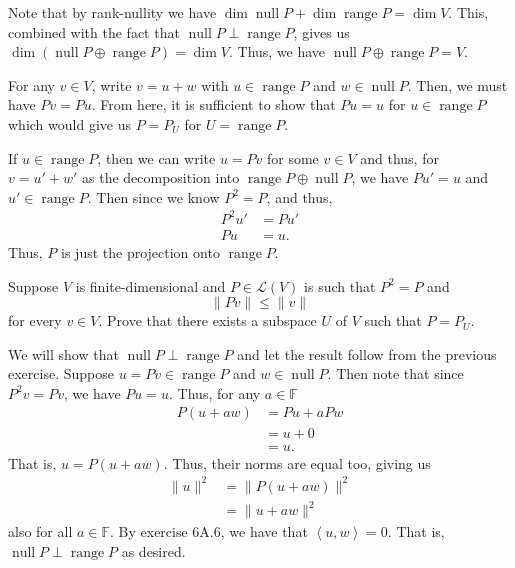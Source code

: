 \documentclass[12 pt, letterpaper]{hmcpset}
\begin{document}
\begin{solution}
	Note that by rank-nullity we have $\dim \operatorname{null} P + \dim \operatorname{range} P = \dim V$. This, combined with the fact that $\operatorname{null} P \perp \operatorname{range} P$, gives us $\dim (\operatorname{null} P \oplus \operatorname{range} P) = \dim V$. Thus, we have $\operatorname{null} P \oplus \operatorname{range} P = V$.

	For any $v \in V$, write $v = u + w$ with $u \in \operatorname{range} P$ and $w \in \operatorname{null} P$. Then, we must have $Pv = Pu$. From here, it is sufficient to show that $Pu = u$ for $u \in \operatorname{range} P$ which would give us $P = P_{U}$ for $U = \operatorname{range} P$.

	If $u \in \operatorname{range} P$, then we can write $u = Pv$ for some $v \in V$ and thus, for $v = u' + w'$ as the decomposition into $\operatorname{range} P \oplus \operatorname{null} P$, we have $Pu' = u$ and $u' \in \operatorname{range} P$. Then since we know $P^{2} = P$, and thus,
	\[
		\begin{split}
			P^{2} u' & = P u' \\
			P u & = u.
		\end{split}
	\]
	Thus, $P$ is just the projection onto $\operatorname{range} P$.
\end{solution}

\pagebreak

\begin{problem}[8]
	Suppose $V$ is finite-dimensional and $P \in \mathcal{L}(V)$ is such that $P^{2} = P$ and
	\[
		\lVert Pv \rVert \le \lVert v \rVert
	\]
	for every $v \in V$. Prove that there exists a subspace $U$ of $V$ such that $P = P_{U}$.
\end{problem}

\begin{solution}
	We will show that $\operatorname{null} P \perp \operatorname{range} P$ and let the result follow from the previous exercise. Suppose $u = Pv \in \operatorname{range} P$ and $w \in \operatorname{null} P$. Then note that since $P^{2} v = Pv$, we have $Pu = u$. Thus, for any $a \in \mathbb{F}$
	\[
		\begin{split}
			P(u + a w) & = Pu + a Pw \\
				   & = u + 0 \\
				   & = u.
		\end{split}
	\]
	That is, $u = P(u + aw)$. Thus, their norms are equal too, giving us
	\[
		\begin{split}
			\lVert u \rVert^{2} & = \lVert P(u + aw) \rVert^{2} \\
					    & = \lVert u + aw \rVert^{2}
		\end{split}
	\]
	also for all $a \in \mathbb{F}$. By exercise 6A.6, we have that $\left < u, w \right > = 0$. That is, $\operatorname{null} P \perp \operatorname{range} P$ as desired.
\end{solution}
\end{document}
